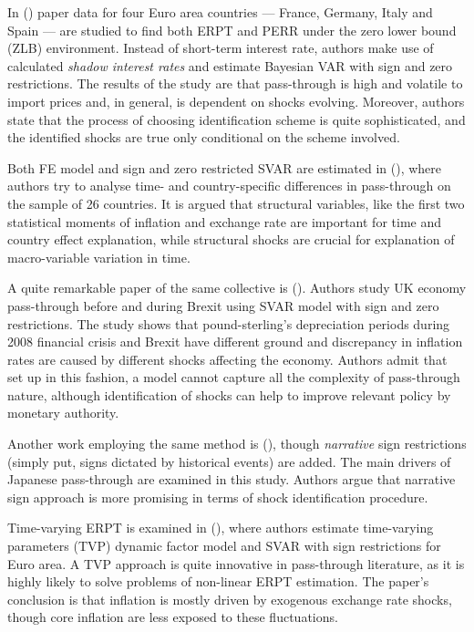 \documentclass[12pt, a4paper]{extarticle}
\begin{document}
In (\cite{Comunale2017}) paper data for four Euro area countries --- France, Germany, Italy and Spain --- are studied to find both ERPT and PERR under the zero lower bound (ZLB) environment. Instead of short-term interest rate, authors make use of calculated \textit{shadow interest rates} and estimate Bayesian VAR with sign and zero restrictions. The results of the study are that pass-through is high and volatile to import prices and, in general, is dependent on shocks evolving. Moreover, authors state that the process of choosing identification scheme is quite sophisticated, and the identified shocks are true only conditional on the scheme involved.

Both FE model and sign and zero restricted SVAR are estimated in (\cite{Forbes2017}), where authors try to analyse time- and country-specific differences in pass-through on the sample of 26 countries. It is argued that structural variables, like the first two statistical moments of inflation and exchange rate are important for time and country effect explanation, while structural shocks are crucial for explanation of macro-variable variation in time.

A quite remarkable paper of the same collective is (\cite{Forbes2018}). Authors study UK economy pass-through before and during Brexit using SVAR model with sign and zero restrictions. The study shows that pound-sterling's depreciation periods during 2008 financial crisis and Brexit have different ground and discrepancy in inflation rates are caused by different shocks affecting the economy. Authors admit that set up in this fashion, a model cannot capture all the complexity of pass-through nature, although identification of shocks can help to improve relevant policy by monetary authority.

Another work employing the same method is (\cite{An2020}), though \textit{narrative} sign restrictions (simply put, signs dictated by historical events) are added. The main drivers of Japanese pass-through are examined in this study. Authors argue that narrative sign approach is more promising in terms of shock identification procedure.

Time-varying ERPT is examined in (\cite{LeivaLeon2019}), where authors estimate time-varying parameters (TVP) dynamic factor model and SVAR with sign restrictions for Euro area. A TVP approach is quite innovative in pass-through literature, as it is highly likely to solve problems of non-linear ERPT estimation. The paper's conclusion is that inflation is mostly driven by exogenous exchange rate shocks, though core inflation are less exposed to these fluctuations.
\end{document}
